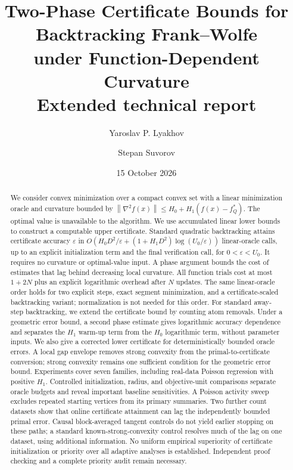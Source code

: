 \documentclass[11pt]{article}
\title{Two-Phase Certificate Bounds for Backtracking Frank--Wolfe\\
under Function-Dependent Curvature\\[3pt]\large Extended technical report}
\author{Yaroslav P. Lyakhov \and Stepan Suvorov}
\date{15 October 2026}
\newcommand{\norm}[1]{\left\|#1\right\|}
\begin{document}
\maketitle
\begin{abstract}
We consider convex minimization over a compact convex set with a linear
minimization oracle and curvature bounded by
$\norm{\nabla^2 f(x)}\le H_0+H_1(f(x)-f_Q^*)$.
The optimal value is unavailable to the algorithm. We use accumulated
linear lower bounds to construct a computable upper certificate. Standard
quadratic backtracking attains certificate accuracy $\varepsilon$ in
$O(H_0D^2/\varepsilon+(1+H_1D^2)\log(U_0/\varepsilon))$ linear-oracle calls,
up to an explicit initialization term and the final verification call,
for $0<\varepsilon<U_0$. It requires no curvature or optimal-value input.
A phase argument bounds the cost of estimates that lag behind decreasing
local curvature. All function trials cost at most $1+2N$ plus an explicit
logarithmic overhead after $N$ updates. The same linear-oracle order holds
for two explicit steps, exact segment minimization, and a
certificate-scaled backtracking variant; normalization is not needed
for this order. For standard away-step backtracking, we extend the
certificate bound by counting atom removals. Under a geometric error
bound, a second phase estimate gives logarithmic
accuracy dependence and separates the $H_1$ warm-up term from the
$H_0$ logarithmic term, without parameter inputs. We also give a corrected
lower certificate for deterministically bounded oracle errors.
A local gap envelope removes strong convexity from the primal-to-certificate
conversion; strong convexity remains one sufficient condition for the
geometric error bound.
Experiments cover seven families, including real-data Poisson regression
with positive $H_1$. Controlled initialization, radius, and objective-unit
comparisons separate oracle budgets and reveal important baseline
sensitivities. A Poisson activity sweep excludes repeated starting
vertices from its primary summaries. Two further count datasets show
that online certificate attainment can lag the independently bounded
primal error. Causal block-averaged tangent controls do not yield earlier
stopping on these paths; a standard known-strong-convexity control
resolves much of the lag on one dataset, using additional information.
No uniform empirical superiority
of certificate initialization or priority over all adaptive analyses
is established.
Independent proof checking and a complete priority audit remain necessary.
\end{abstract}
\end{document}
